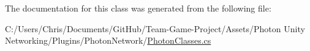 The documentation for this class was generated from the following file\+:\begin{DoxyCompactItemize}
\item 
C\+:/\+Users/\+Chris/\+Documents/\+Git\+Hub/\+Team-\/\+Game-\/\+Project/\+Assets/\+Photon Unity Networking/\+Plugins/\+Photon\+Network/\hyperlink{_photon_classes_8cs}{Photon\+Classes.\+cs}\end{DoxyCompactItemize}
